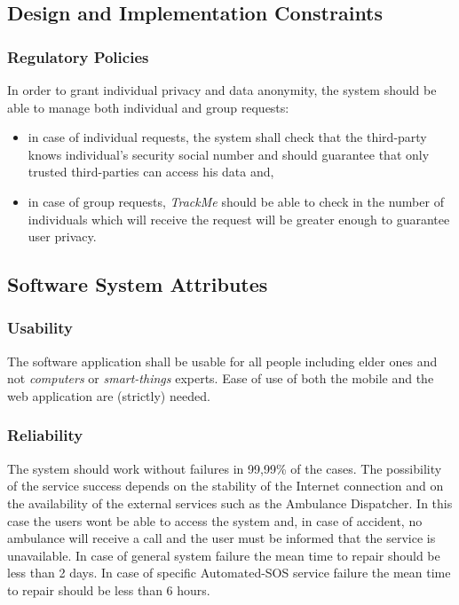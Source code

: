 \documentclass[a4paper]{article}
\begin{document}
        \newpage
        
        \subsection{Design and Implementation Constraints}
    
        \subsubsection{Regulatory Policies}
        In order to grant individual privacy and data anonymity, the system should be able to manage both individual and group requests:
        \begin{itemize}
            \item in case of individual requests, the system shall check that the third-party knows individual's security social number and should guarantee that only trusted third-parties can access his data and,
            \item in case of group requests, \textit{TrackMe} should be able to check in the number of individuals which will receive the request will be greater enough to guarantee user privacy.
        \end{itemize}
        
        \subsection{Software System Attributes}
        \subsubsection{Usability}
        The software application shall be usable for all people including elder ones and not \textit{computers} or \textit{smart-things} experts. Ease of use of both the mobile and the web application are (strictly) needed.
        
        \subsubsection{Reliability}
        The system should work without failures in 99,99\% of the cases. The possibility of the service success depends on the stability of the Internet connection and on the availability of the external services such as the Ambulance Dispatcher. In this case the users wont be able to access the system and, in case of accident, no ambulance will receive a call and the user must be informed that the service is unavailable.
        In case of general system failure the mean time to repair should be less than 2 days.
        In case of specific Automated-SOS service failure the mean time to repair should be less than 6 hours.
       
\end{document}
